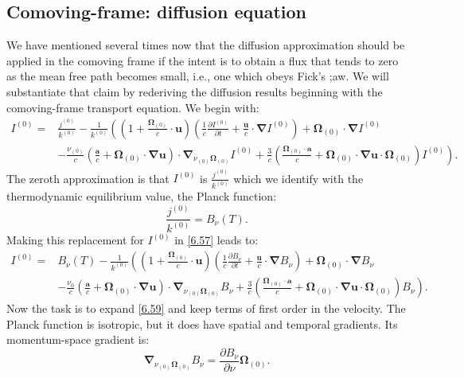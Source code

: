 \documentclass[letterpaper]{report}
\newcommand\bn{\boldsymbol{\nabla}}
\newcommand\bo{\boldsymbol{\Omega}}
\newcommand\bu{\mathbf{u}}
\newcommand\bs{\boldsymbol}
\renewcommand{\(}{\left(}
\renewcommand{\)}{\right)}
\renewcommand{\[}{\left[}
\renewcommand{\]}{\right]}
\begin{document}
\subsection{Comoving-frame: diffusion equation}
We have mentioned several times now that the diffusion approximation should be
applied in the comoving frame if the intent is to obtain a flux that tends to
zero as the mean free path becomes small, i.e., one which obeys Fick's ;aw. We
will substantiate that claim by rederiving the diffusion results beginning
with the comoving-frame transport equation. We begin with:
\begin{equation}
  \begin{split}
    I^{(0)} =& \frac{j^{(0)}}{k^{(0)}}-\frac{1}{k^{(0)}}\(\(1+
    \frac{\bo_{(0)}}{c}\cdot\bu\)\(\frac{1}{c}\frac{\partial I^{(0)}}{\partial
    t} +\frac{\bu}{c}\cdot\bn I^{(0)}\) + \bo_{(0)}\cdot \bn I^{(0)}\right.\\
    &\left.-\frac{\nu_{(0)}}{c}\(\frac{\bs{a}}{c} + \bo_{(0)}\cdot \bn \bu\)\cdot
    \bn_{\nu_{(0)}\bo_{(0)}} I^{(0)} +\frac{3}{c} \(\frac{\bo_{(0)}\cdot
    \bs{a}}{c} + \bo_{(0)} \cdot \bn\bu\cdot\bo_{(0)}\)I^{(0)}\).
    \label{6.57}
  \end{split} 
\end{equation}
The zeroth approximation is that $I^{(0)}$ is $\frac{j^{(0)}}{k^{(0)}}$ which
we identify with the thermodynamic equilibrium value, the Planck function:
\begin{equation}
  \frac{j^{(0)}}{k^{(0)}} = B_{\nu}(T).
  \label{6.58}
\end{equation}
Making this replacement for $I^{(0)}$ in \cref{6.57} leads to:
\begin{equation}
  \begin{split}
    I^{(0)} =& B_{\nu}(T)-\frac{1}{k^{(0)}} \(\(1+\frac{\bo_{(0)}}{c}\cdot
    \bu\)\(\frac{1}{c}\frac{\partial B_{\nu}}{\partial t} +
    \frac{\bu}{c}\cdot\bn B_{\nu}\) + \bo_{(0)}\cdot \bn B_{\nu}\right.\\
    &\left.-\frac{\nu_0}{c}\(\frac{\bs{a}}{c}+\bo_{(0)}\cdot\bn\bu\)\cdot
    \bn_{\nu_{(0)}\bo_{(0)}}B_{\nu} +
    \frac{3}{c}\(\frac{\bo_{(0)}\cdot\bs{a}}{c} +\bo_{(0)}\cdot\bn \bu
    \cdot\bo_{(0)}\) B_{\nu}\). 
    \label{6.59}
  \end{split}
\end{equation}
Now the task is to expand \cref{6.59} and keep terms of first order in the
velocity. The Planck function is isotropic, but it does have spatial and
temporal gradients. Its momentum-space gradient is:
\begin{equation}
  \bn_{\nu_{(0)}\bo_{(0)}} B_{\nu} = \frac{\partial
  B_{\nu}}{\partial\nu}\bo_{(0)}.
  \label{6.60}
\end{equation}
\end{document}
